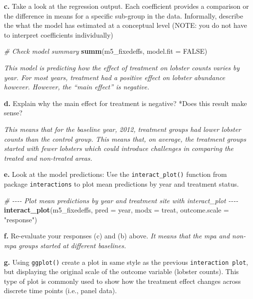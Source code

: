 \documentclass[
]{article}
\newenvironment{Shaded}{\begin{snugshade}}{\end{snugshade}}
\newcommand{\AttributeTok}[1]{\textcolor[rgb]{0.13,0.29,0.53}{#1}}
\newcommand{\CommentTok}[1]{\textcolor[rgb]{0.56,0.35,0.01}{\textit{#1}}}
\newcommand{\ConstantTok}[1]{\textcolor[rgb]{0.56,0.35,0.01}{#1}}
\newcommand{\FunctionTok}[1]{\textcolor[rgb]{0.13,0.29,0.53}{\textbf{#1}}}
\newcommand{\NormalTok}[1]{#1}
\newcommand{\StringTok}[1]{\textcolor[rgb]{0.31,0.60,0.02}{#1}}
\begin{document}
\textbf{c.} Take a look at the regression output. Each coefficient
provides a comparison or the difference in means for a specific
sub-group in the data. Informally, describe the what the model has
estimated at a conceptual level (NOTE: you do not have to interpret
coefficients individually)

\begin{Shaded}
\begin{Highlighting}[]
\CommentTok{\# Check model summary}
\FunctionTok{summ}\NormalTok{(m5\_fixedeffs, }\AttributeTok{model.fit =} \ConstantTok{FALSE}\NormalTok{)}
\end{Highlighting}
\end{Shaded}

\emph{This model is predicting how the effect of treatment on lobster
counts varies by year. For most years, treatment had a positive effect
on lobster abundance however. However, the ``main effect'' is negative.}

\textbf{d.} Explain why the main effect for treatment is negative? *Does
this result make sense?

\emph{This means that for the baseline year, 2012, treatment groups had
lower lobster counts than the control group. This means that, on
average, the treatment groups started with fewer lobsters which could
introduce challenges in comparing the treated and non-treated areas.}

\textbf{e.} Look at the model predictions: Use the
\texttt{interact\_plot()} function from package \texttt{interactions} to
plot mean predictions by year and treatment status.

\begin{Shaded}
\begin{Highlighting}[]
\CommentTok{\# {-}{-}{-}{-} Plot mean predictions by year and treatment site with interact\_plot {-}{-}{-}{-}}
\FunctionTok{interact\_plot}\NormalTok{(m5\_fixedeffs,}
              \AttributeTok{pred =}\NormalTok{ year,}
              \AttributeTok{modx =}\NormalTok{ treat,}
              \AttributeTok{outcome.scale =} \StringTok{"response"}\NormalTok{)}
\end{Highlighting}
\end{Shaded}

\textbf{f.} Re-evaluate your responses (c) and (b) above. \emph{It means
that the mpa and non-mpa groups started at different baselines.}

\textbf{g.} Using \texttt{ggplot()} create a plot in same style as the
previous \texttt{interaction\ plot}, but displaying the original scale
of the outcome variable (lobster counts). This type of plot is commonly
used to show how the treatment effect changes across discrete time
points (i.e., panel data).
\end{document}
